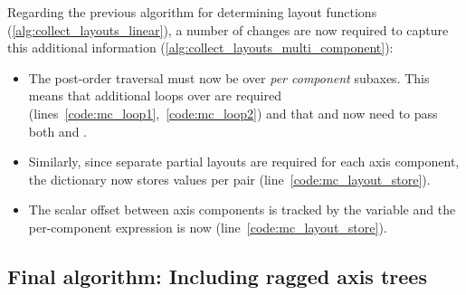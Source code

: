 \documentclass[thesis]{subfiles}
\begin{document}
Regarding the previous algorithm for determining layout functions (\cref{alg:collect_layouts_linear}), a number of changes are now required to capture this additional information (\cref{alg:collect_layouts_multi_component}):

\begin{itemize}
  \item
    The post-order traversal must now be over \textit{per component} subaxes.
    This means that additional loops over  are required (lines~\ref{code:mc_loop1},~\ref{code:mc_loop2}) and that  and  now need to pass both  and .

  \item
    Similarly, since separate partial layouts are required for each axis component, the  dictionary now stores values per  pair (line~\ref{code:mc_layout_store}).

  \item
    The scalar offset between axis components is tracked by the  variable and the per-component expression is now  (line~\ref{code:mc_layout_store}).
\end{itemize}

\subsection{Final algorithm: Including ragged axis trees}
\label{sec:layout_alg_ragged}
\end{document}

